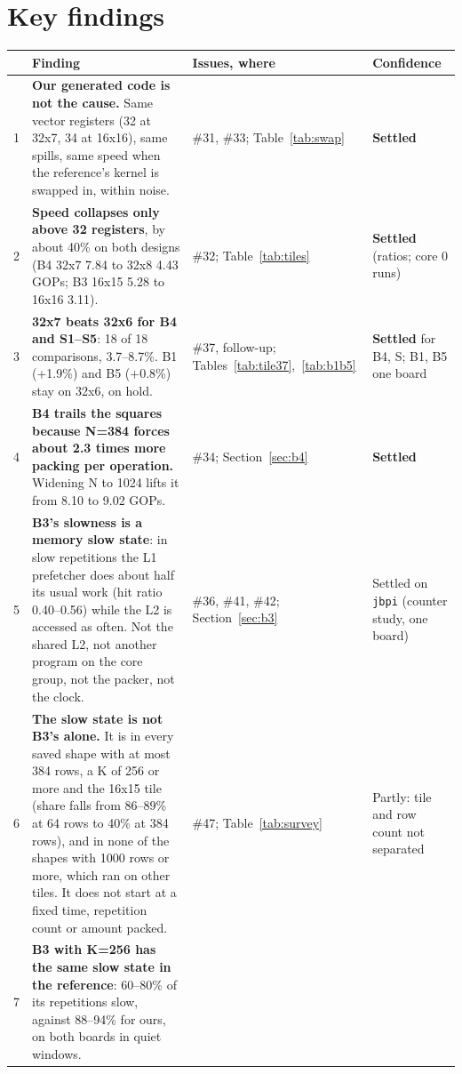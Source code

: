 \documentclass[11pt,a4paper]{article}
\newcommand{\good}[1]{\textcolor{green!45!black}{\textbf{#1}}}
\begin{document}
\section*{Key findings}
\label{sec:key}
{\small
\begin{tabularx}{\linewidth}{@{}r >{\raggedright\arraybackslash}X >{\raggedright\arraybackslash}p{2.6cm} >{\raggedright\arraybackslash}p{2.9cm}@{}}
\toprule
 & \textbf{Finding} & \textbf{Issues, where} & \textbf{Confidence} \\
\midrule
1 & \textbf{Our generated code is not the cause.} Same vector registers (32 at 32x7, 34 at 16x16), same spills, same speed when the reference's kernel is
swapped in, within noise. & \#31, \#33; Table~\ref{tab:swap} & \good{Settled} \\
2 & \textbf{Speed collapses only above 32 registers}, by about 40\% on both designs (B4 32x7 7.84 to 32x8 4.43 GOPs; B3 16x15 5.28 to 16x16 3.11). &
\#32; Table~\ref{tab:tiles} & \good{Settled} (ratios; core 0 runs) \\
3 & \textbf{32x7 beats 32x6 for B4 and S1--S5}: 18 of 18 comparisons, 3.7--8.7\%. B1 (+1.9\%) and B5 (+0.8\%) stay on 32x6, on hold. & \#37, follow-up;
Tables~\ref{tab:tile37},~\ref{tab:b1b5} & \good{Settled} for B4, S; B1, B5 one board \\
4 & \textbf{B4 trails the squares because N=384 forces about 2.3 times more packing per operation.} Widening N to 1024 lifts it from 8.10 to 9.02 GOPs. &
\#34; Section~\ref{sec:b4} & \good{Settled} \\
5 & \textbf{B3's slowness is a memory slow state}: in slow repetitions the L1 prefetcher does about half its usual work (hit ratio 0.40--0.56) while the L2 is
accessed as often. Not the shared L2, not another program on the core group, not the packer, not the clock. & \#36, \#41, \#42; Section~\ref{sec:b3} & Settled on \texttt{jbpi} (counter study, one board) \\
6 & \textbf{The slow state is not B3's alone.} It is in every saved shape with at most 384 rows, a K of 256 or more and the 16x15 tile (share falls from 86--89\% at
64 rows to 40\% at 384 rows), and in none of the shapes with 1000 rows or more, which ran on other tiles. It does not start at a fixed time, repetition
count or amount packed. & \#47; Table~\ref{tab:survey} & Partly: tile and row count not separated \\
7 & \textbf{B3 with K=256 has the same slow state in the reference}: 60--80\% of its repetitions slow, against 88--94\% for ours, on both boards in quiet windows. &

\end{tabularx}}
\end{document}
